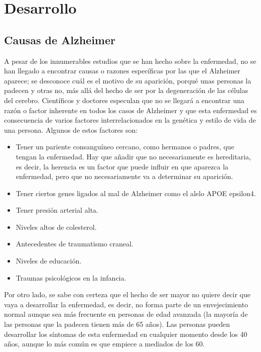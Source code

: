 \documentclass[smallextended, 12pt]{article}
\begin{document}
	\section{Desarrollo}
	\subsection{Causas de Alzheimer}
	A pesar de los innumerables estudios que se han hecho sobre la enfermedad, no se han llegado a encontrar causas o razones espec\'ificas por las que el Alzheimer aparece; se desconoce cu\'al es el motivo de su aparici\'on, porqu\'e unas personas la padecen y otras no, m\'as all\'a del hecho de ser por la degeneraci\'on de las c\'elulas del cerebro. Cient\'ificos y doctores especulan que no se llegar\'a a encontrar una raz\'on o factor inherente en todos los casos de Alzheimer y que esta enfermedad es consecuencia de varios factores interrelacionados en la gen\'etica y estilo de vida de una persona. Algunos de estos factores son: \cite{ref4}
	\begin{itemize}
		\item Tener un pariente consangu\'ineo cercano, como hermanos o padres, que tengan la enfermedad. Hay que a\~nadir que no necesariamente es hereditaria, es decir, la herencia  es un factor que puede influir en que aparezca la enfermedad, pero que no necesariamente va a determinar su aparici\'on. \cite{ref4}\cite{ref3}
		\item Tener ciertos genes ligados al mal de Alzheimer como el alelo APOE epsilon4. 
		\item Tener presi\'on arterial alta.
		\item Niveles altos de colesterol.
		\item Antecedentes de traumatismo craneal.
		\item Niveles de educaci\'on.
		\item Traumas psicol\'ogicos en la infancia. \cite{ref4}
	\end{itemize} 
	Por otro lado, se sabe con certeza que el hecho de ser mayor no quiere decir que vaya a desarrollar la enfermedad, es decir, no forma parte de un envejecimiento normal aunque sea m\'as frecuente en personas de edad avanzada (la mayor\'ia de las personas que la padecen tienen m\'as de 65 a\~nos). Las personas pueden desarrollar los s\'intomas de esta enfermedad en cualquier momento desde los 40 a\~nos, aunque lo m\'as com\'un es que empiece a mediados de los 60. \cite{ref3} \\
	\\
\end{document}
